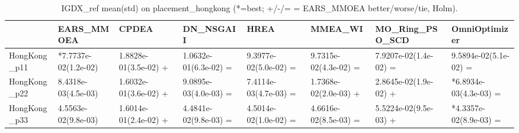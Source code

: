 \begin{table}[t]
\centering
\caption{IGDX_ref mean(std) on placement_hongkong (*=best; +/-/= = EARS_MMOEA better/worse/tie, Holm).}
\label{tab:placement_hongkong_IGDX_ref}
\begin{tabular}{llllllll}
\toprule
 & EARS\_MMOEA & CPDEA & DN\_NSGAII & HREA & MMEA\_WI & MO\_Ring\_PSO\_SCD & OmniOptimizer \\
\midrule
HongKong\_p11 & *7.7737e-02(1.2e-02) & 1.8828e-01(3.5e-02) + & 1.0632e-01(6.3e-02) = & 9.3977e-02(5.0e-02) = & 9.7315e-02(4.3e-02) = & 7.9207e-02(1.4e-02) = & 9.5894e-02(5.1e-02) = \\
HongKong\_p22 & 8.4318e-03(4.5e-03) & 1.6032e-01(3.6e-02) + & 9.0895e-03(4.0e-03) = & 7.4114e-03(4.7e-03) = & 1.7368e-02(2.0e-03) + & 2.8645e-02(1.9e-02) + & *6.8934e-03(4.3e-03) = \\
HongKong\_p33 & 4.5563e-02(9.8e-03) & 1.6014e-01(2.4e-02) + & 4.4841e-02(9.8e-03) = & 4.5014e-02(1.0e-02) = & 4.6616e-02(8.5e-03) = & 5.5224e-02(9.5e-03) + & *4.3357e-02(8.9e-03) = \\
\bottomrule
\end{tabular}
\end{table}

